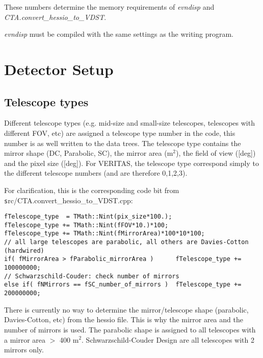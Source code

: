 \documentclass[titlepage,a4paper,twoside,11pt]{report}
\begin{document}
 These numbers determine the memory requirements of {\it evndisp} and {\it CTA.convert\_hessio\_to\_VDST}.

 {\it evndisp} must be compiled with the same settings as the writing program.


\chapter{Detector Setup}


\section{Telescope types}

Different telescope types (e.g. mid-size and small-size telescopes, telescopes with different FOV, etc) are assigned a telescope type number in the code, this number is as well written to the data trees. The telescope type  contains the mirror shape (DC, Parabolic, SC), the mirror area (m$^2$), the field of view ([deg]) and the pixel size ([deg]). For VERITAS, the telescope type correspond simply to the different telescope numbers (and are therefore 0,1,2,3).

For clarification, this is the corresponding code bit from {\texttt src/CTA.convert\_hessio\_to\_VDST.cpp}:

\begin{lstlisting}
fTelescope_type  = TMath::Nint(pix_size*100.);
fTelescope_type += TMath::Nint(fFOV*10.)*100;
fTelescope_type += TMath::Nint(fMirrorArea)*100*10*100;
// all large telescopes are parabolic, all others are Davies-Cotton (hardwired)
if( fMirrorArea > fParabolic_mirrorArea )      fTelescope_type += 100000000;
// Schwarzschild-Couder: check number of mirrors
else if( fNMirrors == fSC_number_of_mirrors )  fTelescope_type += 200000000;
\end{lstlisting}

 There is currently no way to determine the mirror/telescope shape (parabolic, Davies-Cotton, etc) from the hessio file. This is why the mirror area and the number of mirrors is used. 
The parabolic shape is assigned to all telescopes with a mirror area  $>$ 400 m$^2$.
Schwarzschild-Couder Design are all telescopes with 2 mirrors only.





%
%
%

\end{document}
